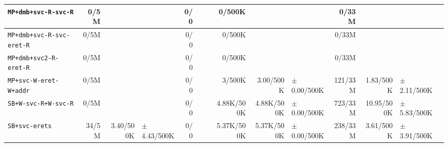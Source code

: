 \begin{tabular}{l  | r r l | r r l | r r l | r r l l}
        \verb|MP+dmb+svc-R-svc-R| &           0/5M &                       &                 &            0/0 &                       &  &         0/500K &                       &                 &          0/33M &                       &                 & \\ \hline 
   \verb|MP+dmb+svc-R-svc-eret-R| &           0/5M &                       &                 &            0/0 &                       &  &         0/500K &                       &                 &          0/33M &                       &                 & \\ \hline 
      \verb|MP+dmb+svc2-R-eret-R| &           0/5M &                       &                 &            0/0 &                       &  &         0/500K &                       &                 &          0/33M &                       &                 & \\ \hline 
      \verb|MP+svc-W-eret-W+addr| &           0/5M &                       &                 &            0/0 &                       &  &         3/500K &             3.00/500K & $\pm$ 0.00/500K &        121/33M &             1.83/500K & $\pm$ 2.11/500K & \\ \hline 
        \verb|SB+W-svc-R+W-svc-R| &           0/5M &                       &                 &            0/0 &                       &  &     4.88K/500K &            4.88K/500K & $\pm$ 0.00/500K &        723/33M &            10.95/500K & $\pm$ 5.83/500K & \\ \hline 
              \verb|SB+svc-erets| &          34/5M &             3.40/500K & $\pm$ 4.43/500K &            0/0 &                       &  &     5.37K/500K &            5.37K/500K & $\pm$ 0.00/500K &        238/33M &             3.61/500K & $\pm$ 3.91/500K & \\ \hline 
\end{tabular}
